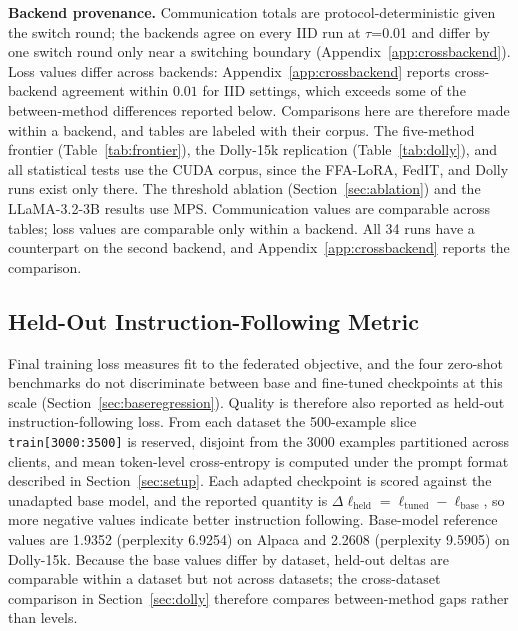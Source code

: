 \documentclass[iicol,pdflatex,sn-mathphys-num]{sn-jnl}
\begin{document}
\textbf{Backend provenance.} Communication totals are protocol-deterministic given the switch round; the backends agree on every IID run at $\tau$=0.01 and differ by one switch round only near a switching boundary (Appendix~\ref{app:crossbackend}). Loss values differ across backends: Appendix~\ref{app:crossbackend} reports cross-backend agreement within $0.01$ for IID settings, which exceeds some of the between-method differences reported below. Comparisons here are therefore made within a backend, and tables are labeled with their corpus. The five-method frontier (Table~\ref{tab:frontier}), the Dolly-15k replication (Table~\ref{tab:dolly}), and all statistical tests use the CUDA corpus, since the FFA-LoRA, FedIT, and Dolly runs exist only there. The threshold ablation (Section~\ref{sec:ablation}) and the LLaMA-3.2-3B results use MPS. Communication values are comparable across tables; loss values are comparable only within a backend. All 34 runs have a counterpart on the second backend, and Appendix~\ref{app:crossbackend} reports the comparison.

\subsection{Held-Out Instruction-Following Metric}
\label{sec:heldout}
Final training loss measures fit to the federated objective, and the four zero-shot benchmarks do not discriminate between base and fine-tuned checkpoints at this scale (Section~\ref{sec:baseregression}). Quality is therefore also reported as held-out instruction-following loss. From each dataset the 500-example slice \texttt{train[3000:3500]} is reserved, disjoint from the 3000 examples partitioned across clients, and mean token-level cross-entropy is computed under the prompt format described in Section~\ref{sec:setup}. Each adapted checkpoint is scored against the unadapted base model, and the reported quantity is $\Delta\ell_{\mathrm{held}} = \ell_{\mathrm{tuned}} - \ell_{\mathrm{base}}$, so more negative values indicate better instruction following. Base-model reference values are 1.9352 (perplexity 6.9254) on Alpaca and 2.2608 (perplexity 9.5905) on Dolly-15k. Because the base values differ by dataset, held-out deltas are comparable within a dataset but not across datasets; the cross-dataset comparison in Section~\ref{sec:dolly} therefore compares between-method gaps rather than levels.
\end{document}
